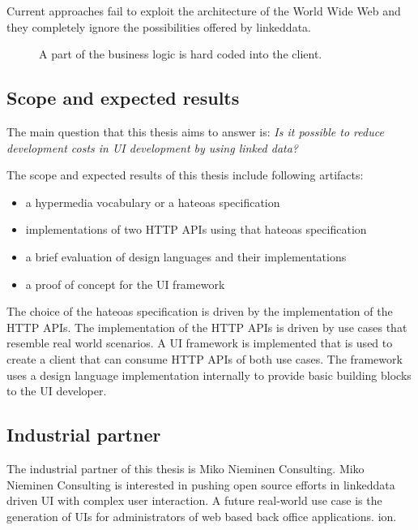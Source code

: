 Current approaches fail to exploit the architecture of the World Wide Web and they completely ignore the possibilities offered by \gls{linkeddata}.

\begin{figure}[!htb]
  \caption{A part of the business logic is hard coded into the client.}
  \label{fig:hardcoded}
\end{figure}

\subsection{Scope and expected results}\label{sec:scope}
The main question that this thesis aims to answer is: \textit{Is it possible to reduce development costs in UI development by using linked data?}

The scope and expected results of this thesis include following artifacts:

\begin{itemize}
\item a \gls{hypermedia} vocabulary or a \gls{hateoas} specification
\item implementations of two HTTP APIs using that \gls{hateoas} specification
\item a brief evaluation of design languages and their implementations
\item a proof of concept for the UI framework
\end{itemize}

The choice of the \gls{hateoas} specification is driven by the implementation of the HTTP APIs. The implementation of the HTTP APIs is driven by use cases that resemble real world scenarios. A UI framework is implemented that is used to create a client that can consume HTTP APIs of both use cases. The framework uses a design language implementation internally to provide basic building blocks to the UI developer.

\subsection{Industrial partner}
The industrial partner of this thesis is Miko Nieminen Consulting. Miko Nieminen Consulting is interested in pushing open source efforts in \gls{linkeddata} driven UI with complex user interaction. A future real-world use case is the generation of UIs for administrators of web based back office applications.
ion.
